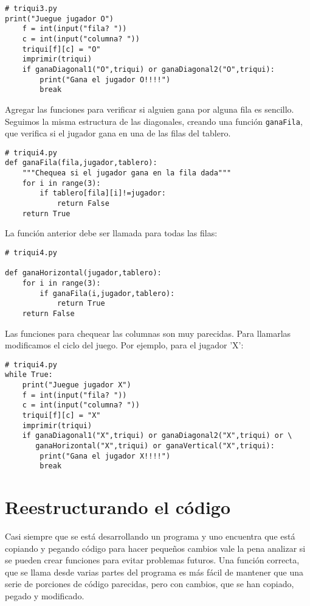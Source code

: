 \begin{lstlisting}
# triqui3.py
print("Juegue jugador O")
    f = int(input("fila? "))
    c = int(input("columna? "))
    triqui[f][c] = "O"
    imprimir(triqui)
    if ganaDiagonal1("O",triqui) or ganaDiagonal2("O",triqui):
        print("Gana el jugador O!!!!")
        break
\end{lstlisting}
Agregar las funciones para verificar si alguien gana por alguna fila
es sencillo. Seguimos la misma estructura de las diagonales, creando
una función \texttt{ganaFila}, que verifica si el jugador gana en
una de las filas del tablero.

\begin{lstlisting}
# triqui4.py
def ganaFila(fila,jugador,tablero):
    """Chequea si el jugador gana en la fila dada"""
    for i in range(3):
        if tablero[fila][i]!=jugador:
            return False
    return True
\end{lstlisting}
La función anterior debe ser llamada para todas las filas:

\begin{lstlisting}
# triqui4.py

def ganaHorizontal(jugador,tablero):
    for i in range(3):
        if ganaFila(i,jugador,tablero):
            return True
    return False
\end{lstlisting}
Las funciones para chequear las columnas son muy parecidas. Para llamarlas
modificamos el ciclo del juego. Por ejemplo, para el jugador 'X':

\begin{lstlisting}
# triqui4.py
while True:
    print("Juegue jugador X")
    f = int(input("fila? "))
    c = int(input("columna? "))
    triqui[f][c] = "X"
    imprimir(triqui)
    if ganaDiagonal1("X",triqui) or ganaDiagonal2("X",triqui) or \
       ganaHorizontal("X",triqui) or ganaVertical("X",triqui):
        print("Gana el jugador X!!!!")
        break
\end{lstlisting}
\section{Reestructurando el código}


Casi siempre que se está desarrollando un programa y uno encuentra
que está copiando y pegando código para hacer pequeños cambios vale
la pena analizar si se pueden crear funciones para evitar problemas
futuros. Una función correcta, que se llama desde varias partes del
programa es más fácil de mantener que una serie de porciones de código
parecidas, pero con cambios, que se han copiado, pegado y modificado.


